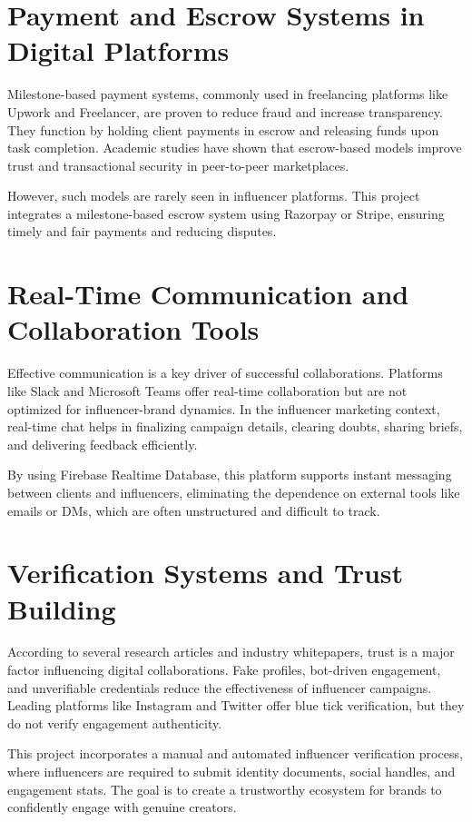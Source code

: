 \begin{justify}
\section{Payment and Escrow Systems in Digital Platforms}
Milestone-based payment systems, commonly used in freelancing platforms like Upwork and Freelancer, are proven to reduce fraud and increase transparency. They function by holding client payments in escrow and releasing funds upon task completion. Academic studies have shown that escrow-based models improve trust and transactional security in peer-to-peer marketplaces.
\par
However, such models are rarely seen in influencer platforms. This project integrates a milestone-based escrow system using Razorpay or Stripe, ensuring timely and fair payments and reducing disputes.
\section{Real-Time Communication and Collaboration Tools}
Effective communication is a key driver of successful collaborations. Platforms like Slack and Microsoft Teams offer real-time collaboration but are not optimized for influencer-brand dynamics. In the influencer marketing context, real-time chat helps in finalizing campaign details, clearing doubts, sharing briefs, and delivering feedback efficiently.
\par
By using Firebase Realtime Database, this platform supports instant messaging between clients and influencers, eliminating the dependence on external tools like emails or DMs, which are often unstructured and difficult to track.

\section{Verification Systems and Trust Building}
According to several research articles and industry whitepapers, trust is a major factor influencing digital collaborations. Fake profiles, bot-driven engagement, and unverifiable credentials reduce the effectiveness of influencer campaigns. Leading platforms like Instagram and Twitter offer blue tick verification, but they do not verify engagement authenticity.\par
This project incorporates a manual and automated influencer verification process, where influencers are required to submit identity documents, social handles, and engagement stats. The goal is to create a trustworthy ecosystem for brands to confidently engage with genuine creators.

\end{justify}
